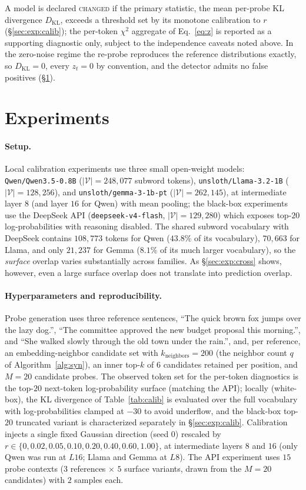 \documentclass[11pt]{article}
\newcommand{\V}{\mathcal{V}}
\theoremstyle{definition}
\begin{document}
A model is declared \textsc{changed} if the primary statistic, the mean
per-probe KL divergence $D_{\mathrm{KL}}$, exceeds a threshold set by its
monotone calibration to $r$ (\S\ref{sec:exp:calib}); the per-token $\chi^2$
aggregate of Eq.~\eqref{eq:z} is reported as a supporting diagnostic only,
subject to the independence caveats noted above. In the zero-noise regime the
re-probe reproduces the reference distributions exactly, so $D_{\mathrm{KL}} =
0$, every $z_t = 0$ by convention, and the detector admits no false positives
(\S\ref{sec:exp}).

\section{Experiments}
\label{sec:exp}

\paragraph{Setup.}
Local calibration experiments use three small open-weight models:
\texttt{Qwen\slash Qwen3.5-0.8B} ($|\V|=248{,}077$ subword tokens),
\texttt{unsloth\slash Llama-3.2-1B} ($|\V|=128{,}256$), and
\texttt{unsloth\slash gemma-3-1b-pt} ($|\V|=262{,}145$), at intermediate
layer $8$ (and layer $16$ for Qwen) with mean pooling; the black-box
experiments use the DeepSeek API (\texttt{deepseek-v4-flash}, $|\V|=129{,}280$)
which exposes
top-$20$ log-probabilities with reasoning disabled. The shared subword
vocabulary with DeepSeek contains $108{,}773$ tokens for Qwen ($43.8\%$ of its
vocabulary), $70{,}663$ for Llama, and only $21{,}237$ for Gemma ($8.1\%$ of
its much larger vocabulary), so the \emph{surface} overlap varies
substantially across families. As \S\ref{sec:exp:cross} shows, however, even a
large surface overlap does not translate into prediction overlap.

\paragraph{Hyperparameters and reproducibility.}
Probe generation uses three reference sentences, ``The quick brown fox jumps
over the lazy dog.'', ``The committee approved the new budget proposal this
morning.'', and ``She walked slowly through the old town under the rain.'',
and, per reference, an embedding-neighbor candidate set with
$k_{\mathrm{neighbors}} = 200$ (the neighbor count $q$ of
Algorithm~\ref{alg:syn}), an inner top-$k$ of $6$ candidates retained per
position, and $M = 20$ candidate probes. The observed token set for the
per-token diagnostics is the top-$20$
next-token log-probability surface (matching the API); locally (white-box), the
KL divergence of Table~\ref{tab:calib} is evaluated over the full vocabulary with
log-probabilities clamped at $-30$ to avoid underflow, and the black-box
top-$20$ truncated variant is characterized separately in
\S\ref{sec:exp:calib}. Calibration
injects a single fixed Gaussian direction (seed $0$) rescaled by
$r \in \{0, 0.02, 0.05, 0.10, 0.20, 0.40, 0.60, 1.00\}$, at intermediate layers
$8$ and $16$ (only Qwen was run at $L16$; Llama and Gemma at $L8$). The API
experiment uses $15$ probe contexts ($3$ references $\times$ $5$ surface
variants, drawn from the $M = 20$ candidates) with $2$ samples each.
\end{document}
